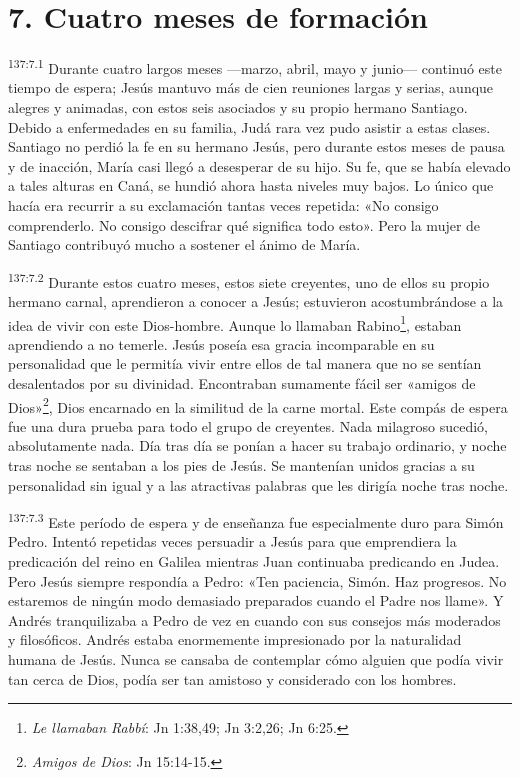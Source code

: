 \section*{7. Cuatro meses de formación}
\par 
\textsuperscript{137:7.1} Durante cuatro largos meses ---marzo, abril, mayo y junio--- continuó este tiempo de espera; Jesús mantuvo más de cien reuniones largas y serias, aunque alegres y animadas, con estos seis asociados y su propio hermano Santiago. Debido a enfermedades en su familia, Judá rara vez pudo asistir a estas clases. Santiago no perdió la fe en su hermano Jesús, pero durante estos meses de pausa y de inacción, María casi llegó a desesperar de su hijo. Su fe, que se había elevado a tales alturas en Caná, se hundió ahora hasta niveles muy bajos. Lo único que hacía era recurrir a su exclamación tantas veces repetida: «No consigo comprenderlo. No consigo descifrar qué significa todo esto». Pero la mujer de Santiago contribuyó mucho a sostener el ánimo de María.

\par 
\textsuperscript{137:7.2} Durante estos cuatro meses, estos siete creyentes, uno de ellos su propio hermano carnal, aprendieron a conocer a Jesús; estuvieron acostumbrándose a la idea de vivir con este Dios-hombre. Aunque lo llamaban Rabino\footnote{\textit{Le llamaban Rabbí}: Jn 1:38,49; Jn 3:2,26; Jn 6:25.}, estaban aprendiendo a no temerle. Jesús poseía esa gracia incomparable en su personalidad que le permitía vivir entre ellos de tal manera que no se sentían desalentados por su divinidad. Encontraban sumamente fácil ser «amigos de Dios»\footnote{\textit{Amigos de Dios}: Jn 15:14-15.}, Dios encarnado en la similitud de la carne mortal. Este compás de espera fue una dura prueba para todo el grupo de creyentes. Nada milagroso sucedió, absolutamente nada. Día tras día se ponían a hacer su trabajo ordinario, y noche tras noche se sentaban a los pies de Jesús. Se mantenían unidos gracias a su personalidad sin igual y a las atractivas palabras que les dirigía noche tras noche.

\par 
\textsuperscript{137:7.3} Este período de espera y de enseñanza fue especialmente duro para Simón Pedro. Intentó repetidas veces persuadir a Jesús para que emprendiera la predicación del reino en Galilea mientras Juan continuaba predicando en Judea. Pero Jesús siempre respondía a Pedro: «Ten paciencia, Simón. Haz progresos. No estaremos de ningún modo demasiado preparados cuando el Padre nos llame». Y Andrés tranquilizaba a Pedro de vez en cuando con sus consejos más moderados y filosóficos. Andrés estaba enormemente impresionado por la naturalidad humana de Jesús. Nunca se cansaba de contemplar cómo alguien que podía vivir tan cerca de Dios, podía ser tan amistoso y considerado con los hombres.

